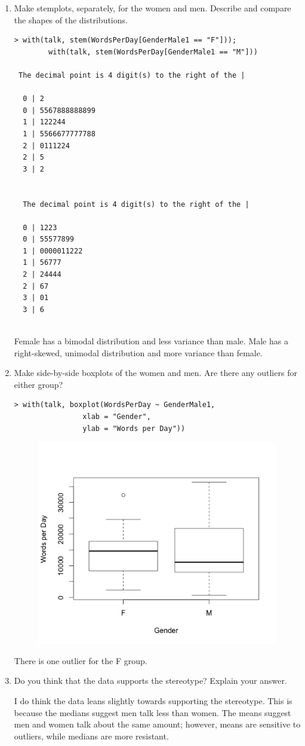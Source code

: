 \documentclass[12pt]{article}
\begin{document}
\begin{enumerate}[label=(\alph*)]
\item Make stemplots, separately, for the women and men. Describe and compare the shapes of the distributions.
\begin{lstlisting}
> with(talk, stem(WordsPerDay[GenderMale1 == "F"])); 
		with(talk, stem(WordsPerDay[GenderMale1 == "M"]))

 The decimal point is 4 digit(s) to the right of the |

  0 | 2
  0 | 5567888888899
  1 | 122244
  1 | 5566677777788
  2 | 0111224
  2 | 5
  3 | 2


  The decimal point is 4 digit(s) to the right of the |

  0 | 1223
  0 | 55577899
  1 | 0000011222
  1 | 56777
  2 | 24444
  2 | 67
  3 | 01
  3 | 6
  
\end{lstlisting}

Female has a bimodal distribution and less variance than male. Male has a right-skewed, unimodal distribution and more variance than female. 

\item Make side-by-side boxplots of the women and men. Are there any outliers for either group?
\begin{lstlisting}
> with(talk, boxplot(WordsPerDay ~ GenderMale1, 
				xlab = "Gender", 
				ylab = "Words per Day"))
\end{lstlisting}
\begin{figure}[h!]
\centering
\includegraphics[scale=.8]{genderPlot.png}
\end{figure}
There is one outlier for the F group.  

\item Do you think that the data supports the stereotype? Explain your answer.

I do think the data leans slightly towards supporting the stereotype. This is because the medians suggest men talk less than women. The means suggest men and women talk about the same amount; however, means are sensitive to outliers, while medians are more resistant. 
\end{enumerate} 
\end{document}
